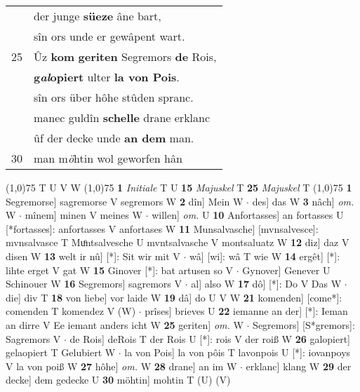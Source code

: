 \documentclass[8pt,a4paper,notitlepage]{article}
\begin{document}
\begin{table}[ht]
\begin{minipage}[t]{0.5\linewidth}
\begin{tabular}{rl}
 & der junge \textbf{süeze} âne bart,\\ 
 & sîn ors unde er gewâpent wart.\\ 
25 & Ûz \textbf{kom} \textbf{geriten} Segremors \textbf{de} Rois,\\ 
 & \textbf{g\textit{al}opiert} ulter \textbf{la von Pois}.\\ 
 & sîn ors über hôhe stûden spranc.\\ 
 & manec guldîn \textbf{schelle} drane erklanc\\ 
 & ûf der decke unde \textbf{an dem} man.\\ 
30 & man m\textit{ö}htin wol geworfen hân\\ 
\end{tabular}
\scriptsize
\line(1,0){75} \newline
T U V W \newline
\line(1,0){75} \newline
\textbf{1} \textit{Initiale} T U  \textbf{15} \textit{Majuskel} T  \textbf{25} \textit{Majuskel} T  \newline
\line(1,0){75} \newline
\textbf{1} Segremorse] sagremorse V segremors W \textbf{2} dîn] Mein W  $\cdot$ des] das W \textbf{3} nâch] \textit{om.} W  $\cdot$ mînem] minen V meines W  $\cdot$ willen] \textit{om.} U \textbf{10} Anfortasses] an fortasses U [*fortasses]: anfortasses V anfortases W \textbf{11} Munsalvasche] [mvnsalvesce]: mvnsalvasce T Muͦntsalvesche U mvntsalvasche V montsaluatz W \textbf{12} diz] daz V disen W \textbf{13} welt ir nû] [*]: Sit wir mit V  $\cdot$ wâ] [wi]: wâ T wie W \textbf{14} ergêt] [*]: lihte erget V gat W \textbf{15} Ginover [*]: bat artusen so V  $\cdot$ Gynover] Genever U Schinouer W \textbf{16} Segremors] sagremors V  $\cdot$ al] also W \textbf{17} dô] [*]: Do V Das W  $\cdot$ die] div T \textbf{18} von liebe] vor laide W \textbf{19} dâ] do U V W \textbf{21} komenden] [come*]: comenden T komendez V (W)  $\cdot$ prîses] brieves U \textbf{22} iemanne an der] [*]: Ieman an dirre V Ee iemant anders icht W \textbf{25} geriten] \textit{om.} W  $\cdot$ Segremors] [S*gremors]: Sagremors V  $\cdot$ de Rois] deRois T der Rois U [*]: rois V der roiß W \textbf{26} galopiert] gelaopiert T Gelubiert W  $\cdot$ la von Pois] la von pôis T lavonpois U [*]: iovanpoys V la von poiß W \textbf{27} hôhe] \textit{om.} W \textbf{28} drane] an im W  $\cdot$ erklanc] klang W \textbf{29} der decke] dem gedecke U \textbf{30} möhtin] mohtin T (U) (V) \newline
\end{minipage}
\end{table}
\end{document}
